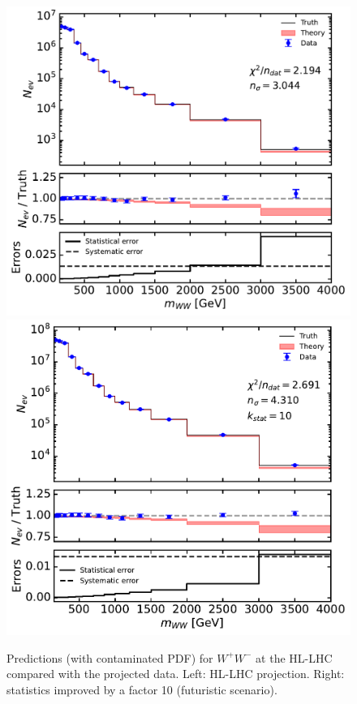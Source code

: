 \documentclass[withindex,glossary]{cam-thesis}
\begin{document}
\begin{figure}[H]
  \includegraphics[scale=0.45]{Figures/plot_ww_hllhc_with_fluct.pdf}
  \includegraphics[scale=0.45]{Figures/plot_ww_hllhc_with_fluct_opt_unc.pdf}
  \caption{Predictions (with contaminated PDF) for $W^+ W^-$ at the HL-LHC compared with the projected data. Left: HL-LHC projection. Right: statistics improved by a factor 10 (futuristic scenario).}
  \label{fig:ww_hllhc}
      \end{figure}
\end{document}

